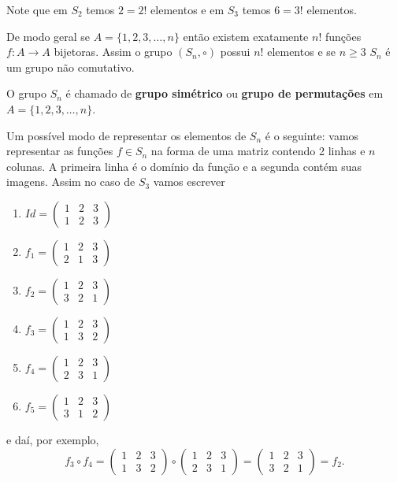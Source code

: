 Note que em $S_2$ temos $2 = 2!$ elementos e em $S_3$ temos $6 = 3!$ elementos.

De modo geral se $A = \{1, 2, 3, \dots, n\}$ então existem exatamente $n!$ funções $f : A \to A$ bijetoras. Assim o grupo $(S_n, \circ)$ possui $n!$ elementos e se $n \geqslant 3$ $S_n$ é um grupo não comutativo.

\begin{definicao}
	O grupo $S_n$ é chamado de \textbf{grupo simétrico} ou \textbf{grupo de permutações} em $A = \{1, 2, 3, \dots, n\}$.
\end{definicao}


Um possível modo de representar os elementos de $S_n$ é o seguinte: vamos representar as funções $f \in S_n$ na forma de uma matriz contendo 2 linhas e $n$ colunas. A primeira linha é o domínio da função e a segunda contém suas imagens. Assim no caso de $S_3$ vamos escrever
\begin{multicols}{3}
	\begin{enumerate}
		\item[] $Id = \begin{pmatrix}
			1 & 2 & 3\\
			1 & 2 & 3
		\end{pmatrix}$
		\item[] $f_1 = \begin{pmatrix}
			1 & 2 & 3\\
			2 & 1 & 3
		\end{pmatrix}$
		\item[] $f_2 = \begin{pmatrix}
			1 & 2 & 3\\
			3 & 2 & 1
		\end{pmatrix}$
		\item[] $f_3 = \begin{pmatrix}
			1 & 2 & 3\\
			1 & 3 & 2
		\end{pmatrix}$
		\item[] $f_4 = \begin{pmatrix}
			1 & 2 & 3\\
			2 & 3 & 1
		\end{pmatrix}$
		\item[] $f_5 = \begin{pmatrix}
			1 & 2 & 3\\
			3 & 1 & 2
		\end{pmatrix}$
	\end{enumerate}
\end{multicols}
e daí, por exemplo,
\[
	f_3\circ f_4 = \begin{pmatrix}
			1 & 2 & 3\\
			1 & 3 & 2
		\end{pmatrix} \circ \begin{pmatrix}
			1 & 2 & 3\\
			2 & 3 & 1
		\end{pmatrix} = \begin{pmatrix}
			1 & 2 & 3\\
			3 & 2 & 1
		\end{pmatrix} = f_2.
\]


